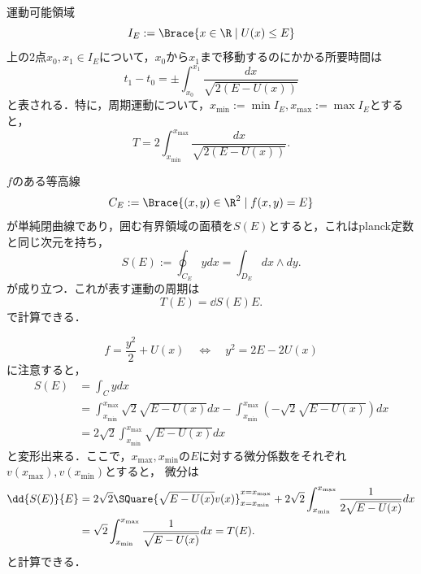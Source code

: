 \documentclass[uplatex,dvipdfmx]{jsreport}
\begin{document}
\begin{corollary}
    運動可能領域
    \[I_E:=\Brace{x\in\R\mid U(x)\le E}\]
    上の2点$x_0,x_1\in I_E$について，$x_0$から$x_1$まで移動するのにかかる所要時間は
    \[t_1-t_0=\pm\int^{x_1}_{x_0}\frac{dx}{\sqrt{2(E-U(x))}}\]
    と表される．特に，周期運動について，$x_{\mathrm{min}}:=\min I_E,x_{\mathrm{max}}:=\max I_E$とすると，
    \[T=2\int^{x_{\text{max}}}_{x_{\text{min}}}\frac{dx}{\sqrt{2(E-U(x))}}.\]
\end{corollary}

\begin{problem}[閉軌道の周期]
    $f$のある等高線
    \[C_E:=\Brace{(x,y)\in\R^2\mid f(x,y)=E}\]
    が単純閉曲線であり，囲む有界領域の面積を$S(E)$とすると，これはplanck定数と同じ次元を持ち，
    \[S(E):=\oint_{C_E}ydx=\int_{D_E}dx\wedge dy.\]
    が成り立つ．これが表す運動の周期は
    \[T(E)=\dd{S(E)}{E}.\]
    で計算できる．
\end{problem}
\begin{Proof}
    \[f=\frac{y^2}{2}+U(x)\quad\Leftrightarrow\quad y^2=2E-2U(x)\]
    に注意すると，
    \begin{align*}
        S(E)&=\int_Cydx\\
        &=\int^{x_{\mathrm{max}}}_{x_{\mathrm{min}}}\sqrt{2}\sqrt{E-U(x)}dx-\int^{x_{\mathrm{max}}}_{x_{\mathrm{min}}}(-\sqrt{2}\sqrt{E-U(x)})dx\\
        &=2\sqrt{2}\int^{x_{\mathrm{max}}}_{x_{\mathrm{min}}}\sqrt{E-U(x)}dx
    \end{align*}
    と変形出来る．ここで，$x_{\mathrm{max}},x_{\mathrm{min}}$の$E$に対する微分係数をそれぞれ$v(x_{\mathrm{max}}),v(x_{\mathrm{min}})$とすると，
    微分は
    \begin{align*}
        \dd{S(E)}{E}&=2\sqrt{2}\SQuare{\sqrt{E-U(x)}v(x)}^{x=x_{\mathrm{max}}}_{x=x_{\mathrm{min}}}+2\sqrt{2}\int^{x_{\mathrm{max}}}_{x_{\mathrm{min}}}\frac{1}{2\sqrt{E-U(x)}}dx\\
        &=\sqrt{2}\int^{x_{\mathrm{max}}}_{x_{\mathrm{min}}}\frac{1}{\sqrt{E-U(x)}}dx=T(E).
    \end{align*}
    と計算できる．
\end{Proof}
\end{document}

